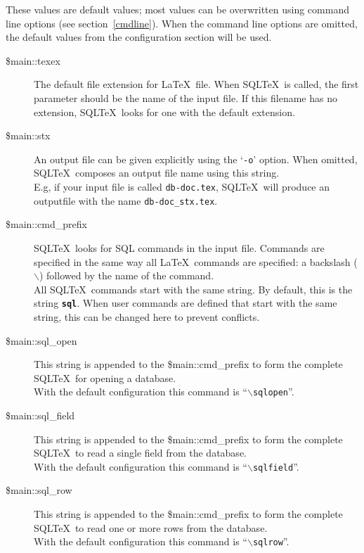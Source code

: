 \documentclass{article}
\newcommand{\bs}{\begin{math}\backslash\end{math}}
\newcommand{\vs}{\vspace{3mm}}
\begin{document}
\vs

These values are default values; most values can be overwritten using command line
options (see section~\ref{cmdline}). When the command line options are
omitted, the default values from the configuration section will be used.

\begin{description}

\item[\$main::texex] The default file extension for \LaTeX\ file. When SQL\TeX\ is called, the first
parameter should be the name of the input file. If this filename has no extension,
SQL\TeX\ looks for one with the default extension.

\item[\$main::stx] An output file can be given explicitly using the `\texttt{-o}' option. When omitted,
SQL\TeX\ composes an output file name using this string.\\
E.g, if your input file is called \texttt{db-doc.tex}, SQL\TeX\ will produce an
outputfile with the name \texttt{db-doc\_stx.tex}.

\item[\$main::cmd\_prefix]\label{prefix} SQL\TeX\ looks for SQL commands in the input file. Commands are specified in the
same way all \LaTeX\ commands are specified: a backslash (\bs) followed by the
name of the command.\\
All SQL\TeX\ commands start with the same string. By default, this is the string
\texttt{\textbf{sql}}. When user commands are defined that start with the same
string, this can be changed here to prevent conflicts.

\item[\$main::sql\_open] This string is appended to the \$main::cmd\_prefix to form the complete SQL\TeX\
for opening a database.\\
With the default configuration this command is ``\texttt{\bs sqlopen}''.

\item[\$main::sql\_field] This string is appended to the \$main::cmd\_prefix to form the complete SQL\TeX\
to read a single field from the database.\\
With the default configuration this command is ``\texttt{\bs sqlfield}''.

\item[\$main::sql\_row] This string is appended to the \$main::cmd\_prefix to form the complete SQL\TeX\
to read one or more rows from the database.\\
With the default configuration this command is ``\texttt{\bs sqlrow}''.


\end{description}
\end{document}
